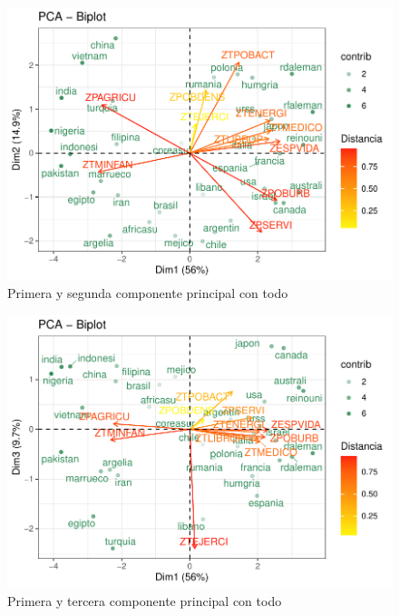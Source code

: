 \documentclass[12pt,twoside]{report}
\begin{document}
\begin{figure}[H]
\includegraphics[width=\textwidth]{../code/figures/primera_segunda_todo.pdf}
\caption{Primera y segunda componente principal con todo}
\label{fig:primera_segunda_todo}
\end{figure} 

\begin{figure}[H]
\includegraphics[width=\textwidth]{../code/figures/primera_tercera_todo.pdf}
\caption{Primera y tercera componente principal con todo}
\label{fig:primera_tercera_todo}
\end{figure} 
\end{document}
